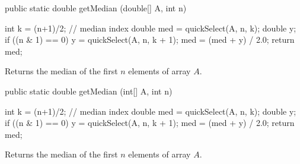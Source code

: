\begin{htmlonly}
\end{htmlonly}
\begin{code}

   public static double getMedian (double[] A, int n)\begin{hide} {
      int k = (n+1)/2;     // median index
      double med = quickSelect(A, n, k);
      double y;
      if ((n & 1) == 0) {
         y = quickSelect(A, n, k + 1);
         med = (med + y) / 2.0;
      }
      return med;
   }\end{hide}
\end{code}
\begin{tabb}
   Returns the median of the first $n$ elements of array $A$.
\end{tabb}
\begin{htmlonly}
\end{htmlonly}
\begin{code}

   public static double getMedian (int[] A, int n)\begin{hide} {
      int k = (n+1)/2;     // median index
      double med = quickSelect(A, n, k);
      double y;
      if ((n & 1) == 0) {
         y = quickSelect(A, n, k + 1);
         med = (med + y) / 2.0;
      }
      return med;
   }\end{hide}
\end{code}
\begin{tabb}
   Returns the median of the first $n$ elements of array $A$.
\end{tabb}
\begin{htmlonly}
\end{htmlonly}
